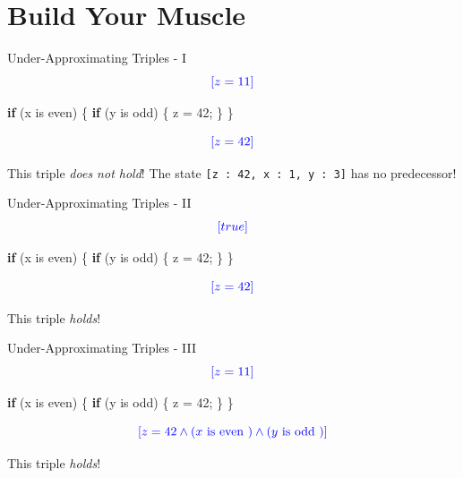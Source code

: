 \documentclass[
  10pt,
  ignorenonframetext,
]{beamer}
\newenvironment{Shaded}{\begin{snugshade}}{\end{snugshade}}
\newcommand{\ControlFlowTok}[1]{\textcolor[rgb]{0.99,0.74,0.29}{\textbf{#1}}}
\newcommand{\DecValTok}[1]{\textcolor[rgb]{0.96,0.45,0.00}{#1}}
\newcommand{\NormalTok}[1]{\textcolor[rgb]{0.81,0.81,0.76}{#1}}
\newcommand{\OperatorTok}[1]{\textcolor[rgb]{0.81,0.81,0.76}{#1}}
\newcommand{\blue}[1]{\textcolor{blue}{#1}}
\begin{document}
\section{Build Your Muscle}\label{build-your-muscle}

\begin{frame}[fragile]{Under-Approximating Triples - I}
\label{under-approximating-triples---i}
\[
\blue{[z = 11]}
\]

\begin{Shaded}
\begin{Highlighting}[]
\ControlFlowTok{if} \OperatorTok{(}\NormalTok{x is even}\OperatorTok{)} \OperatorTok{\{}
    \ControlFlowTok{if} \OperatorTok{(}\NormalTok{y is odd}\OperatorTok{)} \OperatorTok{\{}
\NormalTok{        z }\OperatorTok{=} \DecValTok{42}\OperatorTok{;}
    \OperatorTok{\}}
\OperatorTok{\}}
\end{Highlighting}
\end{Shaded}

\[
\blue{[z = 42]}
\]

\pause

This triple \emph{does not hold}! The state
\texttt{{[}z\ :\ 42,\ x\ :\ 1,\ y\ :\ 3{]}} has no predecessor!
\end{frame}

\begin{frame}[fragile]{Under-Approximating Triples - II}
\label{under-approximating-triples---ii}
\[
\blue{[true]}
\]

\begin{Shaded}
\begin{Highlighting}[]
\ControlFlowTok{if} \OperatorTok{(}\NormalTok{x is even}\OperatorTok{)} \OperatorTok{\{}
    \ControlFlowTok{if} \OperatorTok{(}\NormalTok{y is odd}\OperatorTok{)} \OperatorTok{\{}
\NormalTok{        z }\OperatorTok{=} \DecValTok{42}\OperatorTok{;}
    \OperatorTok{\}}
\OperatorTok{\}}
\end{Highlighting}
\end{Shaded}

\[
\blue{[z = 42]}
\]

\pause

This triple \emph{holds}!
\end{frame}

\begin{frame}[fragile]{Under-Approximating Triples - III}
\label{under-approximating-triples---iii}
\[
\blue{[z = 11]}
\]

\begin{Shaded}
\begin{Highlighting}[]
\ControlFlowTok{if} \OperatorTok{(}\NormalTok{x is even}\OperatorTok{)} \OperatorTok{\{}
    \ControlFlowTok{if} \OperatorTok{(}\NormalTok{y is odd}\OperatorTok{)} \OperatorTok{\{}
\NormalTok{        z }\OperatorTok{=} \DecValTok{42}\OperatorTok{;}
    \OperatorTok{\}}
\OperatorTok{\}}
\end{Highlighting}
\end{Shaded}

\[
\blue{[z = 42 \land (x \text{ is even }) \land (y \text{ is odd })]}
\]

\pause

This triple \emph{holds}!
\end{frame}
\end{document}
